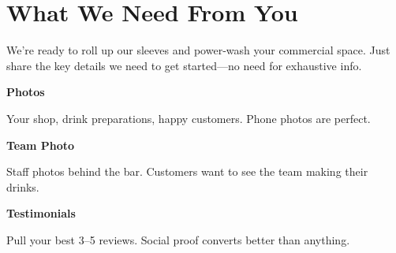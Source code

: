 \documentclass[11pt,letterpaper]{article}
\begin{document}
\vspace{0.2em}

\section*{What We Need From You}

We’re ready to roll up our sleeves and power‑wash your commercial space. Just share the key details we need to get started—no need for exhaustive info.

\vspace{0.12em}

\noindent\begin{minipage}[t]{0.48\textwidth}
\begin{tcolorbox}[colframe=accent-teal, boxrule=1pt, left=0.7em, right=0.7em, top=0.5em, bottom=0.5em, arc=4pt, boxsep=0pt]
{\bfseries\small\color{accent-teal}Photos}

\vspace{0.15em}

{\small Your shop, drink preparations, happy customers. Phone photos are perfect.}
\end{tcolorbox}

\vspace{0.1em}

\begin{tcolorbox}[colframe=accent-teal, boxrule=1pt, left=0.7em, right=0.7em, top=0.5em, bottom=0.5em, arc=4pt, boxsep=0pt]
{\bfseries\small\color{accent-teal}Team Photo}

\vspace{0.15em}

{\small Staff photos behind the bar. Customers want to see the team making their drinks.}
\end{tcolorbox}

\vspace{0.1em}

\begin{tcolorbox}[colframe=accent-teal, boxrule=1pt, left=0.7em, right=0.7em, top=0.5em, bottom=0.5em, arc=4pt, boxsep=0pt]
{\bfseries\small\color{accent-teal}Testimonials}

\vspace{0.15em}

{\small Pull your best 3--5 reviews. Social proof converts better than anything.}
\end{tcolorbox}
\end{minipage}
\hfill
\end{document}
